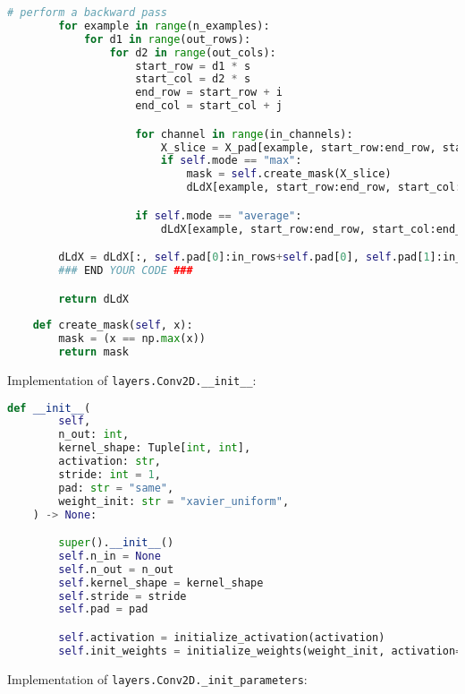 \begin{lstlisting}[language=Python]
        # perform a backward pass
        for example in range(n_examples):
            for d1 in range(out_rows):
                for d2 in range(out_cols):
                    start_row = d1 * s
                    start_col = d2 * s
                    end_row = start_row + i
                    end_col = start_col + j

                    for channel in range(in_channels):
                        X_slice = X_pad[example, start_row:end_row, start_col:end_col, channel]
                        if self.mode == "max":
                            mask = self.create_mask(X_slice)
                            dLdX[example, start_row:end_row, start_col:end_col, channel] += mask * dLdY[example, d1, d2, channel]

                    if self.mode == "average":
                        dLdX[example, start_row:end_row, start_col:end_col, :] += dLdY[example, d1, d2, :] / (i * j)

        dLdX = dLdX[:, self.pad[0]:in_rows+self.pad[0], self.pad[1]:in_cols+self.pad[1], :]
        ### END YOUR CODE ###

        return dLdX
    
    def create_mask(self, x):
        mask = (x == np.max(x))
        return mask

\end{lstlisting}

Implementation of \texttt{layers.Conv2D.__init__}:

\begin{lstlisting}[language=Python]
    def __init__(
        self,
        n_out: int,
        kernel_shape: Tuple[int, int],
        activation: str,
        stride: int = 1,
        pad: str = "same",
        weight_init: str = "xavier_uniform",
    ) -> None:

        super().__init__()
        self.n_in = None
        self.n_out = n_out
        self.kernel_shape = kernel_shape
        self.stride = stride
        self.pad = pad

        self.activation = initialize_activation(activation)
        self.init_weights = initialize_weights(weight_init, activation=activation)

\end{lstlisting}

Implementation of \texttt{layers.Conv2D._init_parameters}:

